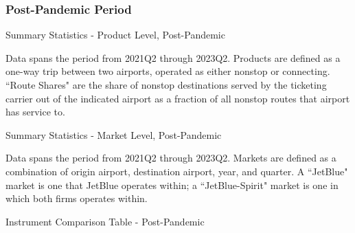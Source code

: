 \documentclass{article}
\begin{document}
\begin{appendices}
	\FloatBarrier
	\subsubsection{Post-Pandemic Period}
		\begin{table}
		\caption{Summary Statistics - Product Level, Post-Pandemic}
		\label{tab:SummaryStatistics_Products_Post}
		
		\footnotesize{Data spans the period from 2021Q2 through 2023Q2. Products are defined as a one-way trip between two airports, operated as either nonstop or connecting. ``Route Shares" are the share of nonstop destinations served by the ticketing carrier out of the indicated airport as a fraction of all nonstop routes that airport has service to. }
	\end{table}
	
	\begin{table}
		\caption{Summary Statistics - Market Level, Post-Pandemic}
		\label{tab:SummaryStatistics_Market_Post}
		
		\footnotesize{Data spans the period from 2021Q2 through 2023Q2. Markets are defined as a combination of origin airport, destination airport, year, and quarter. A ``JetBlue" market is one that JetBlue operates within; a ``JetBlue-Spirit" market is one in which both firms operates within. }
	\end{table}
	
	\begin{landscape}
		\begin{table}
			\caption{Instrument Comparison Table - Post-Pandemic}
			\label{tab:Instrument_Compare}
			
		\end{table}
	\end{landscape}
	
\end{appendices}
	
\end{document}
